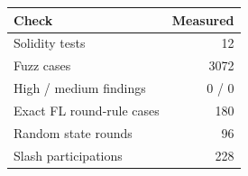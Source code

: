\begin{tabular}{lr}
\toprule
Check & Measured \\
\midrule
Solidity tests & 12 \\
Fuzz cases & 3072 \\
High / medium findings & 0 / 0 \\
Exact FL round-rule cases & 180 \\
Random state rounds & 96 \\
Slash participations & 228 \\
\bottomrule
\end{tabular}
